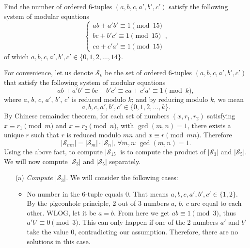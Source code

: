 \documentclass[11pt]{article}
\begin{document}
        \newpage

        \begin{problem}
            Find the number of ordered 6-tuples \((a,b,c,a',b',c')\) satisfy the following system of modular equations
            \[\begin{cases}
                ab + a'b' \equiv 1 \pmod{15} \\
                bc + b'c' \equiv 1 \pmod{15} \\
                ca + c'a' \equiv 1 \pmod{15} 
            \end{cases},\]
            of which \(a,b,c,a',b',c' \in \{0,1,2,\dots,14\}\).
        \end{problem}

        \begin{solution}
            For convenience, let us denote \(\mathcal{S}_k\) be the set of ordered 6-tuples \((a,b,c,a',b',c')\) that satisfy the following system of modular equations
            \[ab + a'b' \equiv bc + b'c' \equiv ca + c'a' \equiv 1 \pmod{k},\]
            where \(a\), \(b\), \(c\), \(a'\), \(b'\), \(c'\) is reduced modulo \(k\); and by reducing modulo \(k\), we mean
            \[a,b,c,a',b',c' \in \{0,1,2,\dots,k\}.\] 
            By Chinese remainder theorem, for each set of numbers \((x,r_1,r_2)\) satisfying \(x \equiv r_1 \pmod{m}\) and \(x \equiv r_2 \pmod{n}\), with \(\gcd(m,n) = 1\), there exists a unique \(r\) such that \(r\) is reduced modulo \(mn\) and \(x \equiv r \pmod{mn}\). Therefore
            \[\left|\mathcal{S}_{mn}\right| = \left|\mathcal{S}_{m}\right| \cdot \left|\mathcal{S}_{n}\right| \text{, } \forall m,n: \gcd(m,n) = 1.\]
            Using the above fact, to compute \(\left|\mathcal{S}_{15}\right|\) is to compute the product of \(\left|\mathcal{S}_{3}\right|\) and \(\left|\mathcal{S}_{5}\right|\). We will now compute \(\left|\mathcal{S}_{3}\right|\) and \(\left|\mathcal{S}_{5}\right|\) separately.

            \begin{enumerate}
                \item[(a)] \textit{Compute \(\left|\mathcal{S}_{3}\right|\).} We will consider the following cases:
                
                \begin{itemize}
                    \item No number in the 6-tuple equals 0. That means \(a,b,c,a',b',c' \in \{1,2\}\). By the pigeonhole principle, 2 out of 3 numbers \(a\), \(b\), \(c\) are equal to each other. WLOG, let it be \(a = b\). From here we get \(ab \equiv 1 \pmod3\), thus \(a'b' \equiv 0 \pmod{3}\). This can only happen if one of the 2 numbers \(a'\) and \(b'\) take the value 0, contradicting our assumption. Therefore, there are no solutions in this case.
                    

\end{itemize}
\end{enumerate}
\end{solution}
\end{document}
